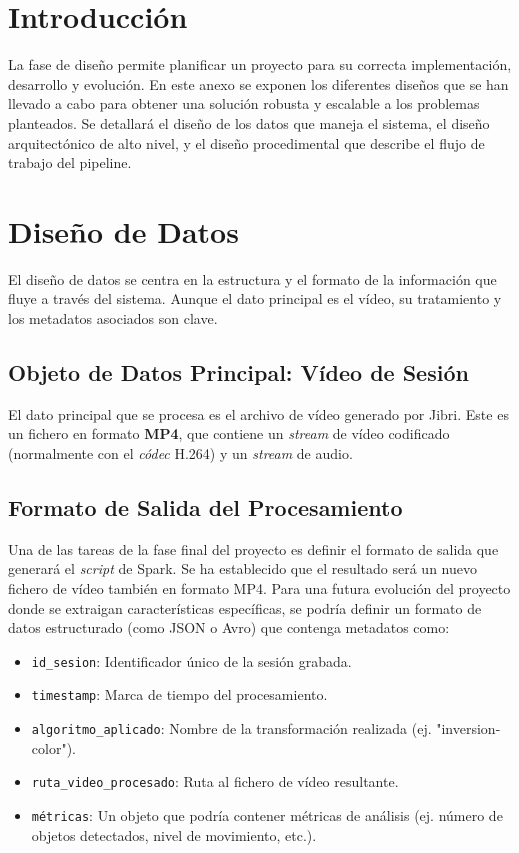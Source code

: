\label{apendice:diseno}

\section{Introducción}
La fase de diseño permite planificar un proyecto para su correcta implementación, desarrollo y evolución. En este anexo se exponen los diferentes diseños que se han llevado a cabo para obtener una solución robusta y escalable a los problemas planteados. Se detallará el diseño de los datos que maneja el sistema, el diseño arquitectónico de alto nivel, y el diseño procedimental que describe el flujo de trabajo del pipeline.

\section{Diseño de Datos}
\label{sec:diseno_datos}
El diseño de datos se centra en la estructura y el formato de la información que fluye a través del sistema. Aunque el dato principal es el vídeo, su tratamiento y los metadatos asociados son clave.

\subsection{Objeto de Datos Principal: Vídeo de Sesión}
El dato principal que se procesa es el archivo de vídeo generado por Jibri. Este es un fichero en formato \textbf{MP4}, que contiene un \textit{stream} de vídeo codificado (normalmente con el \textit{códec} H.264) y un \textit{stream} de audio.

\subsection{Formato de Salida del Procesamiento}
Una de las tareas de la fase final del proyecto es definir el formato de salida que generará el \textit{script} de Spark. Se ha establecido que el resultado será un nuevo fichero de vídeo también en formato MP4. Para una futura evolución del proyecto donde se extraigan características específicas, se podría definir un formato de datos estructurado (como JSON o Avro) que contenga metadatos como:
\begin{itemize}
    \item \texttt{id\_sesion}: Identificador único de la sesión grabada.
    \item \texttt{timestamp}: Marca de tiempo del procesamiento.
    \item \texttt{algoritmo\_aplicado}: Nombre de la transformación realizada (ej. "inversion-color").
    \item \texttt{ruta\_video\_procesado}: Ruta al fichero de vídeo resultante.
    \item \texttt{métricas}: Un objeto que podría contener métricas de análisis (ej. número de objetos detectados, nivel de movimiento, etc.).
\end{itemize}


